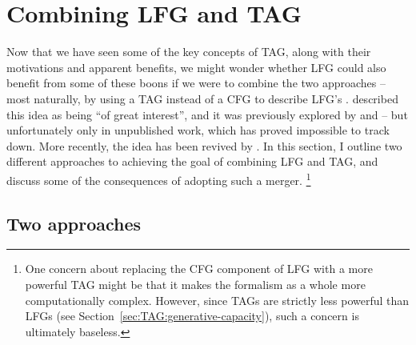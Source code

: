 \documentclass[output=paper,hidelinks]{langscibook}
\begin{document}
\section{Combining LFG and TAG}
\largerpage[-1]
\label{sec:TAG:combining}
Now that we have seen some of the key concepts of TAG, along with their
motivations and apparent benefits, we might wonder whether LFG could also
benefit from some of these boons if we were to combine the two approaches --
most naturally, by using a TAG instead of a CFG to describe LFG's \cstruc.
\citet[496]{joshi:tag-compling-hbk} described this idea as being ``of great
interest'', and it was previously explored by \citet{kameyama:tag-lfg} and
\citet{burheim:tag-lfg} -- but unfortunately only in unpublished work, which has
proved impossible to track down. More recently, the idea has been revived by
\citet{findlay2017,findlay:eacl,findlay2019}. In this section, I outline two
different approaches to achieving the goal of combining LFG and TAG, and discuss
some of the consequences of adopting such a merger.%
%
\footnote{One concern about replacing the CFG component of LFG with a more
  powerful TAG might be that it makes the formalism as a whole more
  computationally complex. However, since TAGs are strictly less powerful than
  LFGs (see Section~\ref{sec:TAG:generative-capacity}), such a concern is ultimately
  baseless.}
%


\subsection{Two approaches}\label{sec:TAG:two-approaches}
\end{document}
